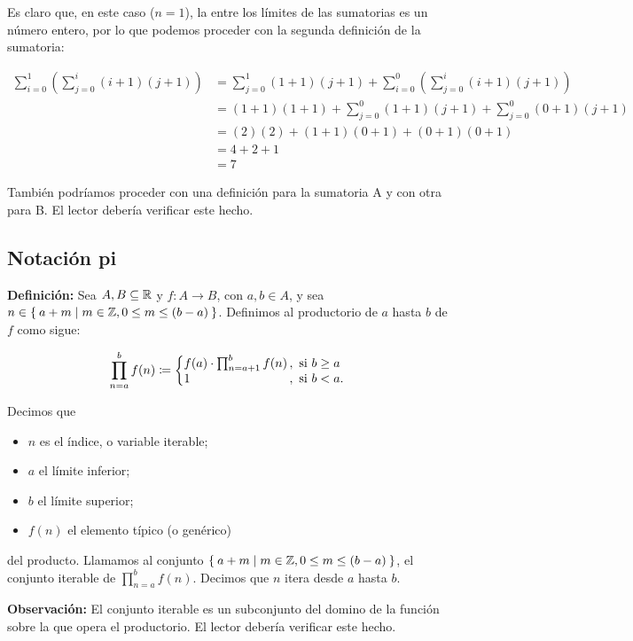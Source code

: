 Es claro que, en este caso ($n=1$), la  entre los límites de las sumatorias es un número entero, por lo que podemos proceder con la segunda definición de la sumatoria:

\begin{align*}
  \sum_{i=0}^{1} \left(\sum_{j=0}^{i}(i+1)(j+1)\right) &= \sum_{j=0}^{1} (1+1) (j+1) + \sum_{i=0}^{0} \left(\sum_{j=0}^{i}(i+1)(j+1)\right)\\
  &= (1+1)(1+1) + \sum_{j=0}^{0} (1+1) (j+1) + \sum_{j=0}^{0} (0+1)(j+1)\\
  &= (2)(2) + (1+1)(0+1) + (0+1)(0+1)\\
  &= 4 + 2 + 1\\
  &= 7
\end{align*}

También podríamos proceder con una definición para la sumatoria A y con otra para B. El lector debería verificar este hecho.

\subsection*{Notación pi}

\textbf{Definición:} Sea $A, B\subseteq \mathbb{R}$ y $f:A \to B$, con $a,b\in A$, y sea $n \in \Set{a + m | m\in \mathbb{Z}, 0\leq m \leq (b-a)}$. Definimos al productorio de $a$ hasta $b$ de $f$ como sigue:

\[
    \prod_{n=a}^{b} f(n) \defined \left\{
    \begin{array}{@{}l@{\thinspace}l}
    f(a) \cdot \prod_{n=a+1}^{b} f(n) &,  \ \text{si}  \ b\geq a\\
    1 &,  \ \text{si}  \ b<a.
    \end{array} \right. \]

Decimos que
\begin{itemize}
  \item $n$ es el índice, o variable iterable;
  \item $a$ el límite inferior;
  \item $b$ el límite superior;
  \item $f(n)$ el elemento típico (o genérico)
\end{itemize}
del producto. Llamamos al conjunto $\Set{a + m | m\in \mathbb{Z}, 0\leq m \leq (b-a)}$, el conjunto iterable de $\prod_{n=a}^{b} f(n)$. Decimos que $n$ itera desde $a$ hasta $b$.

\textbf{Observación:} El conjunto iterable es un subconjunto del domino de la función sobre la que opera el productorio. El lector debería verificar este hecho.

